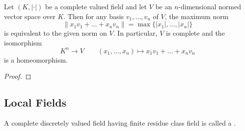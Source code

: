 \begin{theorem}
    Let $(K, |\cdot|)$ be a complete valued field and let $V$ be an $n$-dimensional normed vector space over $K$. Then for any basis $v_1,\dots,v_n$ of $V$, the maximum norm 
    \begin{equation*}
        \|x_1v_1 + \dots + x_nv_n\| = \max\{|x_1|,\dots,|x_n|\}
    \end{equation*}
    is equivalent to the given norm on $V$. In particular, $V$ is complete and the isomorphism 
    \begin{equation*}
        K^n\longrightarrow V\qquad (x_1,\dots,x_n)\longmapsto x_1v_1 + \dots + x_nv_n
    \end{equation*}
    is a homeomorphism.
\end{theorem}
\begin{proof}
    
\end{proof}

\subsection{Local Fields}

\begin{definition}
    A complete discretely valued field having finite residue class field is called a .
\end{definition}

